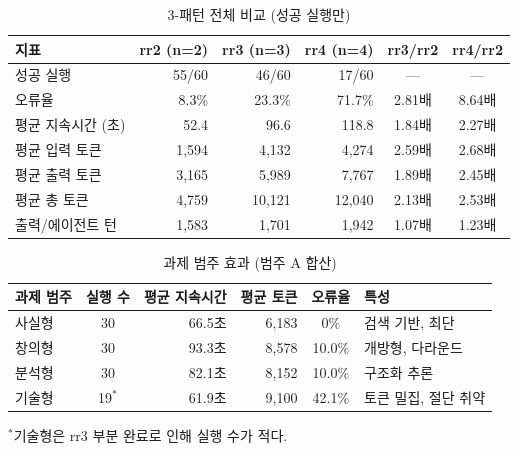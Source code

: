 \documentclass[a4paper,11pt]{article}
\begin{document}
\begin{table}[H]
\centering
\caption{3-패턴 전체 비교 (성공 실행만)}
\label{tab:cat-a-three}
{\small
\begin{tabular}{lrrrcc}
\toprule
지표 & rr2 (n=2) & rr3 (n=3) & rr4 (n=4) & rr3/rr2 & rr4/rr2 \\
\midrule
성공 실행       & 55/60 & 46/60 & 17/60 & --- & --- \\
오류율           & 8.3\% & 23.3\% & 71.7\% & 2.81배 & 8.64배 \\
평균 지속시간 (초) & 52.4 & 96.6 & 118.8 & 1.84배 & 2.27배 \\
평균 입력 토큰   & 1,594 & 4,132 & 4,274 & 2.59배 & 2.68배 \\
평균 출력 토큰   & 3,165 & 5,989 & 7,767 & 1.89배 & 2.45배 \\
평균 총 토큰     & 4,759 & 10,121 & 12,040 & 2.13배 & 2.53배 \\
출력/에이전트 턴 & 1,583 & 1,701 & 1,942 & 1.07배 & 1.23배 \\
\bottomrule
\end{tabular}
}
\end{table}

\begin{table}[H]
\centering
\caption{과제 범주 효과 (범주 A 합산)}
\label{tab:task-category-effect}
{\small
\begin{tabular}{lcrrc l}
\toprule
과제 범주 & 실행 수 & 평균 지속시간 & 평균 토큰 & 오류율 & 특성 \\
\midrule
사실형 & 30 & 66.5초 & 6,183 & 0\% & 검색 기반, 최단 \\
창의형 & 30 & 93.3초 & 8,578 & 10.0\% & 개방형, 다라운드 \\
분석형 & 30 & 82.1초 & 8,152 & 10.0\% & 구조화 추론 \\
기술형 & 19$^{*}$ & 61.9초 & 9,100 & 42.1\% & 토큰 밀집, 절단 취약 \\
\bottomrule
\end{tabular}
}

\smallskip
{\footnotesize $^{*}$기술형은 rr3 부분 완료로 인해 실행 수가 적다.}
\end{table}
\end{document}

